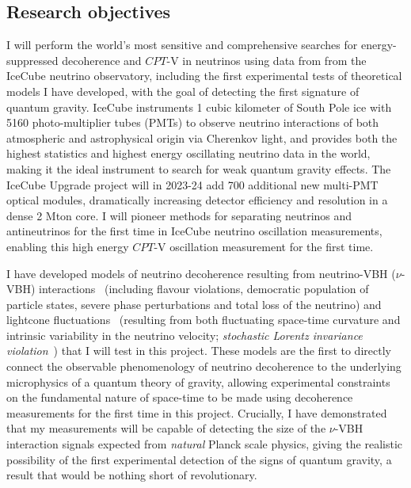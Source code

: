\documentclass[a4paper,11pt]{article}
\begin{document}
\subsection{Research objectives}



I will perform the world's most sensitive and comprehensive searches for energy-suppressed decoherence and $CPT$-V in neutrinos using data from from the IceCube neutrino observatory, including the first experimental tests of theoretical models I have developed, with the goal of detecting the first signature of quantum gravity. IceCube instruments 1 cubic kilometer of South Pole ice with 5160 photo-multiplier tubes (PMTs) to observe neutrino interactions of both atmospheric and astrophysical origin via Cherenkov light, and provides both the highest statistics and highest energy oscillating neutrino data in the world, making it the ideal instrument to search for weak quantum gravity effects. The IceCube Upgrade project will in 2023-24 add 700 additional new multi-PMT optical modules, dramatically increasing detector efficiency and resolution in a dense 2 Mton core. I will pioneer methods for separating neutrinos and antineutrinos for the first time in IceCube neutrino oscillation measurements, enabling this high energy $CPT$-V oscillation measurement for the first time. 

I have developed models of neutrino decoherence resulting from neutrino-VBH ($\nu$-VBH) interactions~\cite{PhysRevD.102.115003} (including flavour violations, democratic population of particle states, severe phase perturbations and total loss of the neutrino) and lightcone fluctuations~\cite{2103.15313} (resulting from both fluctuating space-time curvature and intrinsic variability in the neutrino velocity; \textit{stochastic Lorentz invariance violation}~\cite{Vasileiou2015, Amelino-Camelia:2016fuh}) that I will test in this project. These models are the first to directly connect the observable phenomenology of neutrino decoherence to the underlying microphysics of a quantum theory of gravity, allowing experimental constraints on the fundamental nature of space-time to be made using decoherence measurements for the first time in this project. Crucially, I have demonstrated that my measurements will be capable of detecting the size of the $\nu$-VBH interaction signals expected from \textit{natural} Planck scale physics, giving the realistic possibility of the first experimental detection of the signs of quantum gravity, a result that would be nothing short of revolutionary. 
\end{document}
